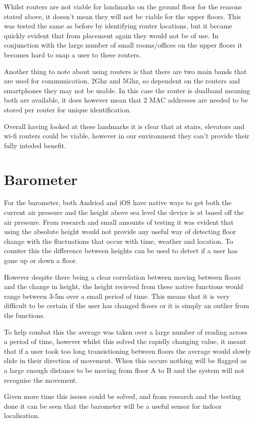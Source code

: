 \documentclass[main.tex]{subfiles}
\begin{document}
Whilst routers are not viable for landmarks on the ground floor for the reasons stated above, it doesn't mean they will not be viable for the upper floors. This was tested the same as before by identifying router locations, but it became quickly evident that from placement again they would not be of use. In conjunction with the large number of small rooms/offices on the upper floors it becomes hard to snap a user to these routers.

Another thing to note about using routers is that there are two main bands that are used for communication, 2Ghz and 5Ghz, so dependent on the routers and smartphones they may not be usable. In this case the router is dualband meaning both are available, it does however mean that 2 MAC addresses are needed to be stored per router for unique identification.

Overall having looked at these landmarks it is clear that at stairs, elevators and wi-fi routers could be viable, however in our environment they can't provide their fully inteded benefit.

\section{Barometer}

For the barometer, both Andriod and iOS have native ways to get both the current air pressure and the height above sea level the device is at based off the air pressure. From research and small amounts of testing it was evident that using the absolute height would not provide any useful way of detecting floor change with the fluctuations that occur with time, weather and location. To counter this the difference between heights can be used to detect if a user has gone up or down a floor. 

However despite there being a clear correlation between moving between floors and the change in height, the height recieved from these native functions would range between 3-5m over a small period of time. This means that it is very difficult to be certain if the user has changed floors or it is simply an outlier from the functions. 

To help combat this the average was taken over a large number of reading across a period of time, however whilst this solved the rapidly changing value, it meant that if a user took too long transistioning between floors the average would slowly slide in their direction of movement. When this occurs nothing will be flagged as a large enough distance to be moving from floor A to B and the system will not recognise the movement. 

Given more time this issues could be solved, and from research and the testing done it can be seen that the barometer will be a useful sensor for indoor localisation.
\end{document}
